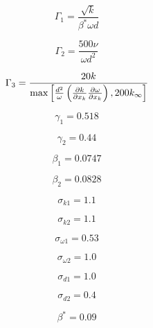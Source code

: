 \begin{equation}
\Gamma_1 = \frac{\sqrt{k}}{\beta^* \omega d}
\end{equation}

\begin{equation}
\Gamma_2 = \frac{500 \nu}{\omega d^2}
\end{equation}

\begin{equation}
\Gamma_3 = \frac{20 k}{{\rm max} \left[ \frac{d^2}{\omega} \left( 
   \frac{\partial k}{\partial x_k} \frac{\partial \omega}{\partial x_k} 
   \right) , 200 k_{\infty} \right]}
\end{equation}

\begin{equation}
\gamma_1 = 0.518
\end{equation}

\begin{equation}
\gamma_2 = 0.44
\end{equation}

\begin{equation}
\beta_1 = 0.0747
\end{equation}

\begin{equation}
\beta_2 = 0.0828
\end{equation}

\begin{equation}
\sigma_{k1} = 1.1
\end{equation}

\begin{equation}
\sigma_{k2} = 1.1
\end{equation}

\begin{equation}
\sigma_{\omega 1} = 0.53
\end{equation}

\begin{equation}
\sigma_{\omega 2} = 1.0
\end{equation}

\begin{equation}
\sigma_{d 1} = 1.0
\end{equation}

\begin{equation}
\sigma_{d 2} = 0.4
\end{equation}

\begin{equation}
\beta^* = 0.09
\end{equation}

